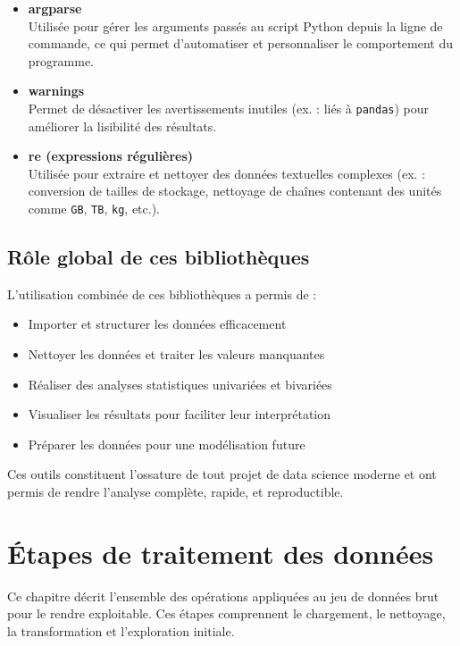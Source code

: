 \documentclass[12pt]{report}
\begin{document}
\begin{itemize}
    \item \textbf{argparse} \\
    Utilisée pour gérer les arguments passés au script Python depuis la ligne de commande, ce qui permet d’automatiser et personnaliser le comportement du programme.

    \item \textbf{warnings} \\
    Permet de désactiver les avertissements inutiles (ex. : liés à \texttt{pandas}) pour améliorer la lisibilité des résultats.

    \item \textbf{re (expressions régulières)} \\
    Utilisée pour extraire et nettoyer des données textuelles complexes (ex. : conversion de tailles de stockage, nettoyage de chaînes contenant des unités comme \texttt{GB}, \texttt{TB}, \texttt{kg}, etc.).
\end{itemize}

\section*{Rôle global de ces bibliothèques}

L’utilisation combinée de ces bibliothèques a permis de :

\begin{itemize}
    \item Importer et structurer les données efficacement
    \item Nettoyer les données et traiter les valeurs manquantes
    \item Réaliser des analyses statistiques univariées et bivariées
    \item Visualiser les résultats pour faciliter leur interprétation
    \item Préparer les données pour une modélisation future
\end{itemize}

Ces outils constituent l’ossature de tout projet de data science moderne et ont permis de rendre l’analyse complète, rapide, et reproductible.

\chapter{Étapes de traitement des données}

Ce chapitre décrit l'ensemble des opérations appliquées au jeu de données brut pour le rendre exploitable. Ces étapes comprennent le chargement, le nettoyage, la transformation et l'exploration initiale.
\end{document}
